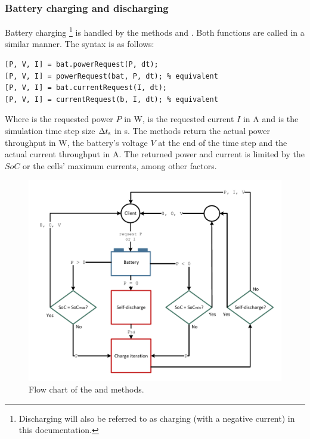 \subsubsection{Battery charging and discharging}
\label{sec:charge_discharge}
Battery charging \footnote{Discharging will also be referred to as charging (with a negative current) in this documentation.} is handled by the methods  and . Both functions are called in a similar manner. The syntax is as follows:
\begin{lstlisting}
[P, V, I] = bat.powerRequest(P, dt);
[P, V, I] = powerRequest(bat, P, dt); % equivalent
[P, V, I] = bat.currentRequest(I, dt);
[P, V, I] = currentRequest(b, I, dt); % equivalent
\end{lstlisting}
Where  is the requested power $P$ in W,  is the requested current $I$ in A and  is the simulation time step size $\Delta t_\text{s}$ in s. The methods return the actual power throughput in W, the battery's voltage $V$ at the end of the time step and the actual current throughput in A. The returned power and current is limited by the $SoC$ or the cells' maximum currents, among other factors.
\begin{figure}[b!]
	\captionsetup{type=figure}
	\centering
	\includegraphics[width=\textwidth]{powerRequest.pdf}
	\caption[Flow chart of the  and  methods]{Flow chart of the  and  methods.}
	\label{fig:powerRequest}
\end{figure}
